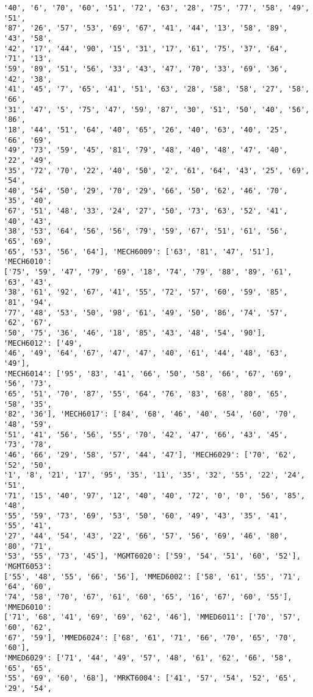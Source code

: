 \documentclass[11pt]{article}
\begin{document}
\begin{Verbatim}[commandchars=\\\{\}]
'40', '6', '70', '60', '51', '72', '63', '28', '75', '77', '58', '49', '51',
'87', '26', '57', '53', '69', '67', '41', '44', '13', '58', '89', '43', '58',
'42', '17', '44', '90', '15', '31', '17', '61', '75', '37', '64', '71', '13',
'59', '89', '51', '56', '33', '43', '47', '70', '33', '69', '36', '42', '38',
'41', '45', '7', '65', '41', '51', '63', '28', '58', '58', '27', '58', '66',
'31', '47', '5', '75', '47', '59', '87', '30', '51', '50', '40', '56', '86',
'18', '44', '51', '64', '40', '65', '26', '40', '63', '40', '25', '66', '69',
'49', '73', '59', '45', '81', '79', '48', '40', '48', '47', '40', '22', '49',
'35', '72', '70', '22', '40', '50', '2', '61', '64', '43', '25', '69', '54',
'40', '54', '50', '29', '70', '29', '66', '50', '62', '46', '70', '35', '40',
'67', '51', '48', '33', '24', '27', '50', '73', '63', '52', '41', '40', '43',
'38', '53', '64', '56', '56', '79', '59', '67', '51', '61', '56', '65', '69',
'65', '53', '56', '64'], 'MECH6009': ['63', '81', '47', '51'], 'MECH6010':
['75', '59', '47', '79', '69', '18', '74', '79', '88', '89', '61', '63', '43',
'38', '61', '92', '67', '41', '55', '72', '57', '60', '59', '85', '81', '94',
'77', '48', '53', '50', '98', '61', '49', '50', '86', '74', '57', '62', '67',
'50', '75', '36', '46', '18', '85', '43', '48', '54', '90'], 'MECH6012': ['49',
'46', '49', '64', '67', '47', '47', '40', '61', '44', '48', '63', '49'],
'MECH6014': ['95', '83', '41', '66', '50', '58', '66', '67', '69', '56', '73',
'65', '51', '70', '87', '55', '64', '76', '83', '68', '80', '65', '58', '35',
'82', '36'], 'MECH6017': ['84', '68', '46', '40', '54', '60', '70', '48', '59',
'51', '41', '56', '56', '55', '70', '42', '47', '66', '43', '45', '73', '78',
'46', '66', '29', '58', '57', '44', '47'], 'MECH6029': ['70', '62', '52', '50',
'1', '8', '21', '17', '95', '35', '11', '35', '32', '55', '22', '24', '51',
'71', '15', '40', '97', '12', '40', '40', '72', '0', '0', '56', '85', '48',
'55', '59', '73', '69', '53', '50', '60', '49', '43', '35', '41', '55', '41',
'27', '44', '54', '43', '22', '66', '57', '56', '69', '46', '80', '80', '71',
'53', '55', '73', '45'], 'MGMT6020': ['59', '54', '51', '60', '52'], 'MGMT6053':
['55', '48', '55', '66', '56'], 'MMED6002': ['58', '61', '55', '71', '64', '60',
'74', '58', '70', '67', '61', '60', '65', '16', '67', '60', '55'], 'MMED6010':
['71', '68', '41', '69', '69', '62', '46'], 'MMED6011': ['70', '57', '60', '62',
'67', '59'], 'MMED6024': ['68', '61', '71', '66', '70', '65', '70', '60'],
'MMED6029': ['71', '44', '49', '57', '48', '61', '62', '66', '58', '65', '65',
'55', '69', '60', '68'], 'MRKT6004': ['41', '57', '54', '52', '65', '29', '54',

\end{Verbatim}
\end{document}
